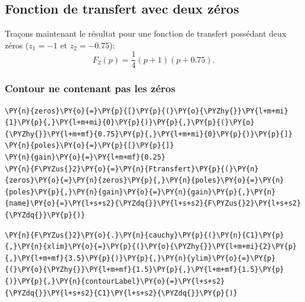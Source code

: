 \subsection{Fonction de transfert avec deux zéros}
Traçons maintenant le résultat pour une fonction de transfert possédant
deux zéros (\(z_1=-1\) et \(z_2=-0.75\)):
\[
F_2(p)=\dfrac{1}{4}(p+1)(p+0.75).
\]
\subsubsection{Contour ne contenant pas les zéros\label{contour-nentourant-pas-les-zuxe9ros}}
\begin{tcolorbox}[breakable, size=fbox, boxrule=1pt, pad at break*=1mm,colback=cellbackground, colframe=cellborder]
\begin{Verbatim}[commandchars=\\\{\}]
\PY{n}{zeros}\PY{o}{=}\PY{p}{[}\PY{p}{(}\PY{o}{\PYZhy{}}\PY{l+m+mi}{1}\PY{p}{,}\PY{l+m+mi}{0}\PY{p}{)}\PY{p}{,}\PY{p}{(}\PY{o}{\PYZhy{}}\PY{l+m+mf}{0.75}\PY{p}{,}\PY{l+m+mi}{0}\PY{p}{)}\PY{p}{]}
\PY{n}{poles}\PY{o}{=}\PY{p}{[}\PY{p}{]}
\PY{n}{gain}\PY{o}{=}\PY{l+m+mf}{0.25}
\PY{n}{F\PYZus{}2}\PY{o}{=}\PY{n}{Ftransfert}\PY{p}{(}\PY{n}{zeros}\PY{o}{=}\PY{n}{zeros}\PY{p}{,}\PY{n}{poles}\PY{o}{=}\PY{n}{poles}\PY{p}{,}\PY{n}{gain}\PY{o}{=}\PY{n}{gain}\PY{p}{,}\PY{n}{name}\PY{o}{=}\PY{l+s+s2}{\PYZdq{}}\PY{l+s+s2}{F\PYZus{}2}\PY{l+s+s2}{\PYZdq{}}\PY{p}{)}
\end{Verbatim}
\end{tcolorbox}
\begin{tcolorbox}[breakable, size=fbox, boxrule=1pt, pad at break*=1mm,colback=cellbackground, colframe=cellborder]
\begin{Verbatim}[commandchars=\\\{\}]
\PY{n}{F\PYZus{}2}\PY{o}{.}\PY{n}{cauchy}\PY{p}{(}\PY{n}{C1}\PY{p}{,}\PY{n}{xlim}\PY{o}{=}\PY{p}{(}\PY{o}{\PYZhy{}}\PY{l+m+mi}{2}\PY{p}{,}\PY{l+m+mf}{3.5}\PY{p}{)}\PY{p}{,}\PY{n}{ylim}\PY{o}{=}\PY{p}{(}\PY{o}{\PYZhy{}}\PY{l+m+mf}{1.5}\PY{p}{,}\PY{l+m+mf}{1.5}\PY{p}{)}\PY{p}{,}\PY{n}{contourLabel}\PY{o}{=}\PY{l+s+s2}{\PYZdq{}}\PY{l+s+s2}{C1}\PY{l+s+s2}{\PYZdq{}}\PY{p}{)}
\end{Verbatim}
\end{tcolorbox}
